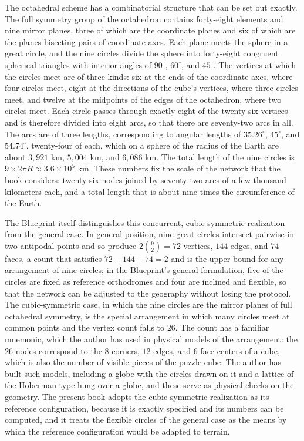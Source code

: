 The octahedral scheme has a combinatorial structure that can be set out exactly. The full symmetry group of the octahedron contains forty-eight elements and nine mirror planes, three of which are the coordinate planes and six of which are the planes bisecting pairs of coordinate axes. Each plane meets the sphere in a great circle, and the nine circles divide the sphere into forty-eight congruent spherical triangles with interior angles of $90^\circ$, $60^\circ$, and $45^\circ$. The vertices at which the circles meet are of three kinds: six at the ends of the coordinate axes, where four circles meet, eight at the directions of the cube's vertices, where three circles meet, and twelve at the midpoints of the edges of the octahedron, where two circles meet. Each circle passes through exactly eight of the twenty-six vertices and is therefore divided into eight arcs, so that there are seventy-two arcs in all. The arcs are of three lengths, corresponding to angular lengths of $35.26^\circ$, $45^\circ$, and $54.74^\circ$, twenty-four of each, which on a sphere of the radius of the Earth are about $3{,}921$ km, $5{,}004$ km, and $6{,}086$ km. The total length of the nine circles is $9\times2\pi R\approx3.6\times10^5$ km. These numbers fix the scale of the network that the book considers: twenty-six nodes joined by seventy-two arcs of a few thousand kilometers each, and a total length that is about nine times the circumference of the Earth.

The Blueprint itself distinguishes this concurrent, cubic-symmetric realization from the general case. In general position, nine great circles intersect pairwise in two antipodal points and so produce $2\binom{9}{2}=72$ vertices, $144$ edges, and $74$ faces, a count that satisfies $72-144+74=2$ and is the upper bound for any arrangement of nine circles; in the Blueprint's general formulation, five of the circles are fixed as reference orthodromes and four are inclined and flexible, so that the network can be adjusted to the geography without losing the protocol. The cubic-symmetric case, in which the nine circles are the mirror planes of full octahedral symmetry, is the special arrangement in which many circles meet at common points and the vertex count falls to $26$. The count has a familiar mnemonic, which the author has used in physical models of the arrangement: the $26$ nodes correspond to the $8$ corners, $12$ edges, and $6$ face centers of a cube, which is also the number of visible pieces of the puzzle cube. The author has built such models, including a globe with the circles drawn on it and a lattice of the Hoberman type hung over a globe, and these serve as physical checks on the geometry. The present book adopts the cubic-symmetric realization as its reference configuration, because it is exactly specified and its numbers can be computed, and it treats the flexible circles of the general case as the means by which the reference configuration would be adapted to terrain.

